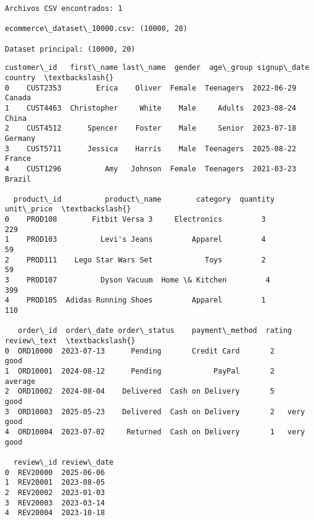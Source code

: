 \documentclass[11pt]{article}
\begin{document}
    \begin{Verbatim}[commandchars=\\\{\}]
Archivos CSV encontrados: 1

ecommerce\_dataset\_10000.csv: (10000, 20)

Dataset principal: (10000, 20)
    \end{Verbatim}

    
    \begin{Verbatim}[commandchars=\\\{\}]
  customer\_id   first\_name last\_name  gender  age\_group signup\_date  country  \textbackslash{}
0    CUST2353        Erica    Oliver  Female  Teenagers  2022-06-29   Canada   
1    CUST4463  Christopher     White    Male     Adults  2023-08-24    China   
2    CUST4512      Spencer    Foster    Male     Senior  2023-07-18  Germany   
3    CUST5711      Jessica    Harris    Male  Teenagers  2025-08-22   France   
4    CUST1296          Amy   Johnson  Female  Teenagers  2021-03-23   Brazil   

  product\_id          product\_name        category  quantity  unit\_price  \textbackslash{}
0    PROD108        Fitbit Versa 3     Electronics         3         229   
1    PROD103          Levi's Jeans         Apparel         4          59   
2    PROD111    Lego Star Wars Set            Toys         2          59   
3    PROD107          Dyson Vacuum  Home \& Kitchen         4         399   
4    PROD105  Adidas Running Shoes         Apparel         1         110   

   order\_id  order\_date order\_status    payment\_method  rating review\_text  \textbackslash{}
0  ORD10000  2023-07-13      Pending       Credit Card       2        good   
1  ORD10001  2024-08-12      Pending            PayPal       2     average   
2  ORD10002  2024-08-04    Delivered  Cash on Delivery       5        good   
3  ORD10003  2025-05-23    Delivered  Cash on Delivery       2   very good   
4  ORD10004  2023-07-02     Returned  Cash on Delivery       1   very good   

  review\_id review\_date  
0  REV20000  2025-06-06  
1  REV20001  2023-08-05  
2  REV20002  2023-01-03  
3  REV20003  2023-03-14  
4  REV20004  2023-10-18  
    \end{Verbatim}
\end{document}
